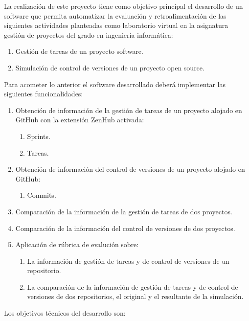 
La realización de este proyecto tiene como objetivo principal el desarrollo de un software que permita automatizar la evaluación y retroalimentación de las siguientes actividades planteadas como laboratorio virtual en la asignatura gestión de proyectos del grado en ingeniería informática:

\begin{enumerate}
	\item Gestión de tareas de un proyecto software. 
	\item Simulación de control de versiones de un proyecto open source.
\end{enumerate}

Para acometer lo anterior el software desarrollado deberá implementar las siguientes funcionalidades:

\begin{enumerate}
	\item Obtención de información de la gestión de tareas de un proyecto alojado en GitHub con la extensión ZenHub activada:
	\begin{enumerate}
		\item Sprints. 
		\item Tareas.	
	\end{enumerate}		
	\item Obtención de información del control de versiones de un proyecto alojado en GitHub:
	\begin{enumerate}
		\item Commits. 	
	\end{enumerate}
	\item Comparación de la información de la gestión de tareas de dos proyectos.
	\item Comparación de la información del control de versiones de dos proyectos.			
	\item Aplicación de rúbrica de evalución  sobre:
	\begin{enumerate}
		\item La información de gestión de tareas y de control de versiones de un repositorio. 
		\item La comparación de la información de gestión de tareas y de control de versiones de dos repositorios, el original y el resultante de la simulación.	
	\end{enumerate}			  
\end{enumerate}

Los objetivos  técnicos del desarrollo son:

